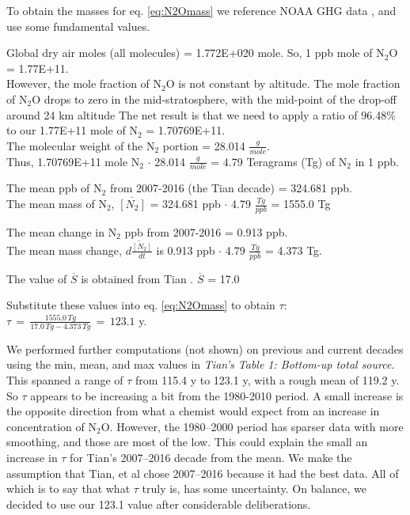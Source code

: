 \documentclass{article}
\begin{document}
To obtain the masses for eq. \ref{eq:N2Omass} we reference NOAA GHG data \cite{NOAA2022AGGIClimateTable}, and use some fundamental values.

Global dry air moles (all molecules) = 1.772E+020 mole. So, 1 ppb mole of N$_2$O = 1.77E+11. \\ 
However, the mole fraction of N$_2$O is not constant by altitude. The mole fraction of N$_2$O drops to zero in the mid-stratosphere, with the mid-point of the drop-off around 24 km altitude The net result is that we need to apply a ratio of 96.48\% to our 1.77E+11 mole of N$_2$ = 1.70769E+11. \\
The molecular weight of the N$_2$ portion = 28.014 $\frac{g}{mole}$. \\
Thus, 1.70769E+11 mole N$_2$ $\cdot$ 28.014 $\frac{g}{mole}$ = 4.79 Teragrams (Tg) of N$_2$ in 1 ppb. 

The mean ppb of N$_2$ from 2007-2016 (the Tian decade) = 324.681 ppb. \\
The mean mass of N$_2$, $\overline{[N_2]}$ = 324.681 ppb $\cdot$ 4.79 $\frac{Tg}{ppb}$ = 1555.0 Tg 

The mean change in N$_2$ ppb from 2007-2016 = 0.913 ppb. \\
The mean mass change, $\overline{d\frac{[N_2]}{dt}}$ is 0.913 ppb $\cdot$ 4.79 $\frac{Tg}{ppb}$ = 4.373 Tg. 

The value of $\overline{S}$ is obtained from Tian \cite[Table 1: Bottom-up total source]{Tian2020N2OSources_sinks}. $\overline{S}$ = 17.0 

Substitute these values into eq. \ref{eq:N2Omass} to obtain $\tau$:\\
$ \tau \, = \, \frac{1555.0 \, Tg}{17.0 \,Tg - 4.373 \,Tg} \, = \, 123.1$ y.

We performed further computations (not shown) on previous and current decades using the min, mean, and max values in \emph{Tian's Table 1: Bottom-up total source}. This spanned a range of $\tau$ from 115.4 y to 123.1 y, with a rough mean of 119.2 y. So $\tau$ appears to be increasing a bit from the 1980-2010 period. A small increase is the opposite direction from what a chemist would expect from an increase in concentration of N$_2$O. However, the 1980--2000 period has sparser data with more smoothing, and those are most of the low. This could explain the small an increase in $\tau$ for Tian's 2007--2016 decade from the mean. We make the assumption that Tian, et al chose 2007--2016 because it had the best data. All of which is to say that what $\tau$ truly is, has some uncertainty. On balance, we decided to use our 123.1 value after considerable deliberations. 
\end{document}

